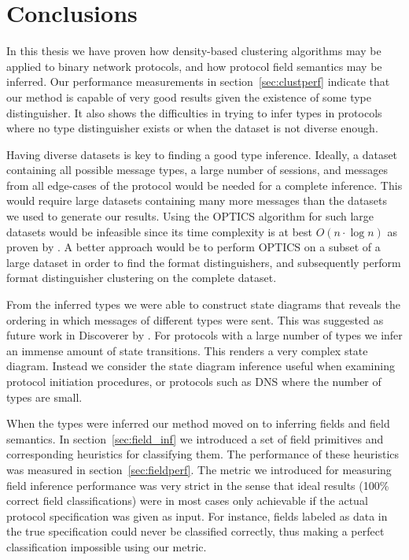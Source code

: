 \documentclass[a4paper]{report}
\begin{document}
\section{Conclusions}
In this thesis we have proven how density-based clustering algorithms may be
applied to binary network protocols, and how protocol field semantics may be
inferred. Our performance measurements in section~\ref{sec:clustperf} indicate
that our method is capable of very good results given the existence of some
type distinguisher. It also shows the difficulties in trying to infer types
in protocols where no type distinguisher exists or when the dataset is
not diverse enough.

Having diverse datasets is key to finding a good type inference. Ideally, a
dataset containing all possible message types, a large number of sessions,
and messages from all edge-cases of the protocol would be needed for a
complete inference. This would require large datasets containing many more
messages than the datasets we used to generate our results. Using the OPTICS
algorithm for such large datasets would be infeasible since its time
complexity is at best $O(n \cdot \log n)$ as proven by \citet{ankerst99}.
A better approach would be to perform OPTICS on a subset of a large dataset
in order to find the format distinguishers, and subsequently perform
format distinguisher clustering on the complete dataset.

From the inferred types we were able to construct state diagrams that reveals
the ordering in which messages of different types were sent. This was suggested
as future work in Discoverer by \citet{cui07}. For protocols with a large
number of types we infer an immense amount of state transitions. This renders
a very complex state diagram. Instead we consider the state diagram inference
useful when examining protocol initiation procedures, or protocols such as
DNS where the number of types are small.

When the types were inferred our method moved on to inferring fields and field
semantics. In section~\ref{sec:field_inf} we introduced a set of
field primitives and corresponding heuristics for classifying them. The
performance of these heuristics was measured in section~\ref{sec:fieldperf}.
The metric we introduced for measuring field inference performance was very
strict in the sense that ideal results (100\% correct field classifications)
were in most cases only achievable if the actual protocol specification was
given as input. For instance, fields labeled as data in the true specification
could never be classified correctly, thus making a perfect classification
impossible using our metric. 
\end{document}
